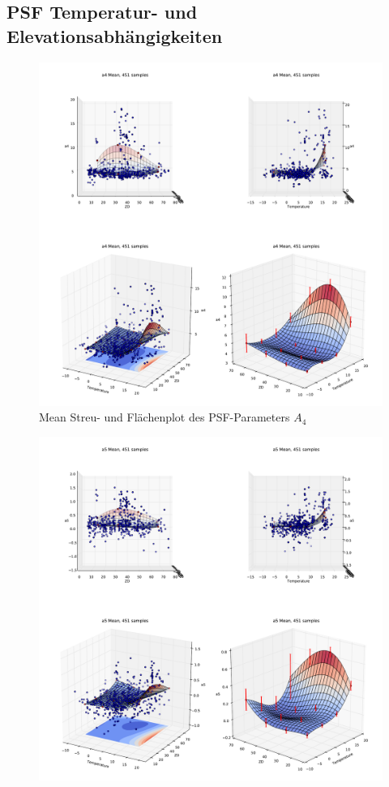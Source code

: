 \begin{appendix}
\section{PSF Temperatur- und Elevationsabhängigkeiten}
\begin{figure}[H]
	\centering
	\includegraphics[scale=.48]{psf_surf/a4_mean.pdf}
	\caption[Mean Streu- und Flächenplot des PSF-Parameters $A_4$]{Mean Streu- und Flächenplot des PSF-Parameters $A_4$}
    \label{psf_surf_a4_mean}
\end{figure}
\begin{figure}[H]
	\centering
	\includegraphics[scale=.48]{psf_surf/a5_mean.pdf}

\end{figure}
\end{appendix}
